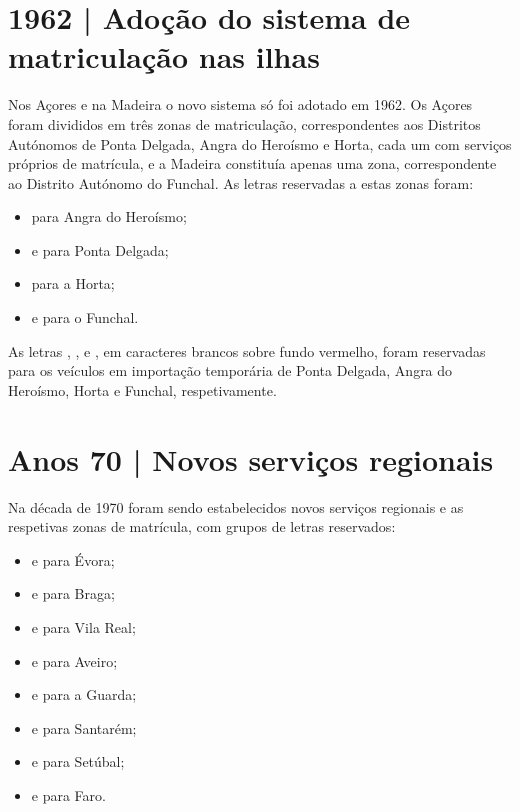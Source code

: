 \section{1962 | Adoção do sistema de matriculação nas ilhas}

Nos Açores e na Madeira o novo sistema só foi adotado em 1962. Os Açores foram
divididos em três zonas de matriculação, correspondentes aos Distritos Autónomos
de Ponta Delgada, Angra do Heroísmo e Horta, cada um com serviços próprios de
matrícula, e a Madeira constituía apenas uma zona, correspondente ao Distrito
Autónomo do Funchal. As letras reservadas a estas zonas foram:
\begin{itemize}
  \item {} para Angra do Heroísmo;
  \item {} e  para Ponta Delgada;
  \item {} para a Horta;
  \item {} e  para o Funchal.
\end{itemize}

As letras , ,  e , em caracteres brancos
sobre fundo vermelho, foram reservadas para os veículos em importação temporária
de Ponta Delgada, Angra do Heroísmo, Horta e Funchal, respetivamente.

\section{Anos 70 | Novos serviços regionais}

Na década de 1970 foram sendo estabelecidos novos serviços regionais e as
respetivas zonas de matrícula, com grupos de letras reservados:
\begin{itemize}
  \item {} e  para Évora;
  \item {} e  para Braga;
  \item {} e  para Vila Real;
  \item {} e  para Aveiro;
  \item {} e  para a Guarda;
  \item {} e  para Santarém;
  \item {} e  para Setúbal;
  \item {} e  para Faro.
\end{itemize}

